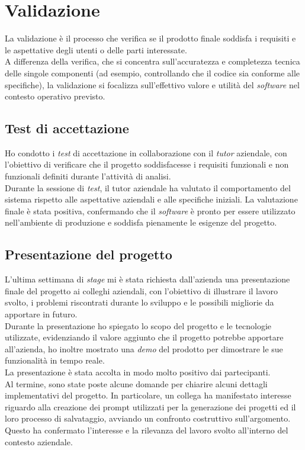 \pagebreak
\section{Validazione}
\label{sez:validazione}

La validazione è il processo che verifica se il prodotto finale soddisfa i requisiti e le aspettative degli utenti o delle parti interessate. \\
A differenza della verifica, che si concentra sull’accuratezza e completezza tecnica delle singole componenti (ad esempio, controllando che il codice sia conforme alle specifiche), la validazione si focalizza sull’effettivo valore e utilità del \textit{software} nel contesto operativo previsto.  \\

\subsection{Test di accettazione}
\label{subsec:test-accettazione}

Ho condotto i \textit{test} di accettazione in collaborazione con il \textit{tutor} aziendale, con l’obiettivo di verificare che il progetto soddisfacesse i requisiti funzionali e non funzionali definiti durante l'attività di analisi.\\

\noindent Durante la sessione di \textit{test}, il tutor aziendale ha valutato il comportamento del sistema rispetto alle aspettative aziendali e alle specifiche iniziali. La valutazione finale è stata positiva, confermando che il \textit{software} è pronto per essere utilizzato nell’ambiente di produzione e soddisfa pienamente le esigenze del progetto.
\subsection{Presentazione del progetto}
\label{subsec:presentazione-progetto}

L'ultima settimana di \textit{stage} mi è stata richiesta dall'azienda una presentazione finale del progetto ai colleghi aziendali, con l'obiettivo di illustrare il lavoro svolto, i problemi riscontrati durante lo sviluppo e le possibili migliorie da apportare in futuro.\\

\noindent Durante la presentazione ho spiegato lo scopo del progetto e le tecnologie utilizzate, evidenziando il valore aggiunto che il progetto potrebbe apportare all'azienda, ho inoltre mostrato una \textit{demo} del prodotto per dimostrare le sue funzionalità in tempo reale.\\  

\noindent La presentazione è stata accolta in modo molto positivo dai partecipanti. \\Al termine, sono state poste alcune domande per chiarire alcuni dettagli implementativi del progetto. In particolare, un collega ha manifestato interesse riguardo alla creazione dei \gls{prompt} utilizzati per la generazione dei progetti ed il loro processo di salvataggio, avviando un confronto costruttivo sull’argomento.\\
Questo ha confermato l’interesse e la rilevanza del lavoro svolto all'interno del contesto aziendale.

